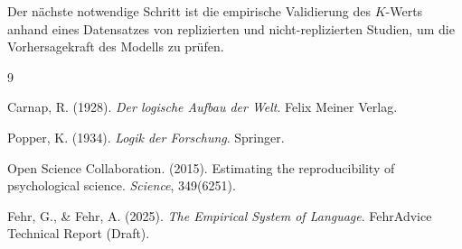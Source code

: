 \documentclass[11pt, a4paper]{article}
\begin{document}
Der nächste notwendige Schritt ist die empirische Validierung des $K$-Werts anhand eines Datensatzes von replizierten und nicht-replizierten Studien, um die Vorhersagekraft des Modells zu prüfen.

\begin{thebibliography}{9}

Carnap, R. (1928). \textit{Der logische Aufbau der Welt}. Felix Meiner Verlag.

Popper, K. (1934). \textit{Logik der Forschung}. Springer.

Open Science Collaboration. (2015). Estimating the reproducibility of psychological science. \textit{Science}, 349(6251).

Fehr, G., \& Fehr, A. (2025). \textit{The Empirical System of Language}. FehrAdvice Technical Report (Draft).

\end{thebibliography}
\end{document}
